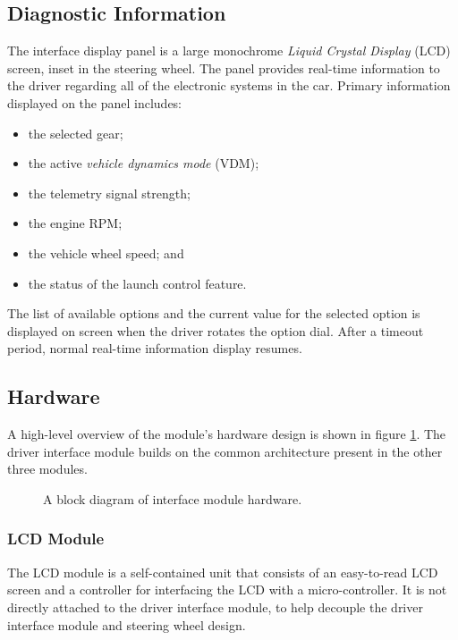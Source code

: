 \subsection{Diagnostic Information}
\label{sec:interface_diag}

The interface display panel is a large monochrome \emph{Liquid Crystal Display} (LCD) screen, inset in the steering wheel. The panel provides real-time information to the driver regarding all of the electronic systems in the car. Primary information displayed on the panel includes:

\begin{itemize}
\item the selected gear;
\item the active \emph{vehicle dynamics mode} (VDM);
\item the telemetry signal strength;
\item the engine RPM;
\item the vehicle wheel speed; and
\item the status of the launch control feature.
\end{itemize}

The list of available options and the current value for the selected option is displayed on screen when the driver rotates the option dial. After a timeout period, normal real-time information display resumes. 

\subsection{Hardware}

A high-level overview of the module's hardware design is shown in figure \ref{fig:interface_hardware_design_block}. The driver interface module builds on the common architecture present in the other three modules. 

\begin{figure}[H]
\centering

\caption{A block diagram of interface module hardware.}
\label{fig:interface_hardware_design_block}
\end{figure}

\subsubsection{LCD Module}

The LCD module is a self-contained unit that consists of an easy-to-read LCD screen and a controller for interfacing the LCD with a micro-controller. It is not directly attached to the driver interface module, to help decouple the driver interface module and steering wheel design.

